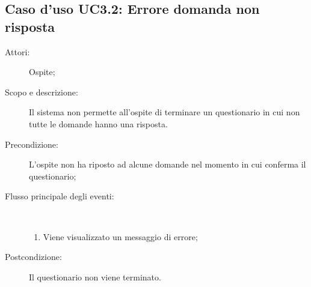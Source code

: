 \subsection{Caso d'uso UC3.2: Errore domanda non risposta}\begin{description}
	\item[Attori:] Ospite;
	\item[Scopo e descrizione:] Il sistema non permette all'ospite di terminare un questionario in cui non tutte le domande hanno una risposta.
	\item[Precondizione:] L'ospite non ha riposto ad alcune domande nel momento in cui conferma il questionario;
	
	\item[Flusso principale degli eventi:] \ 
	\begin{enumerate}
		\item Viene visualizzato un messaggio di errore;
		
	\end{enumerate}
	\item[Postcondizione:] Il questionario non viene terminato.
\end{description}
\hypertarget{UC3.3}{}
